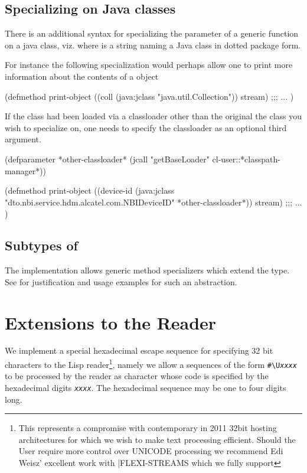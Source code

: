 \documentclass[10pt]{book}
\begin{document}
\subsection{Specializing on Java classes}

There is an additional syntax for specializing the parameter of a
generic function on a java class, viz.  where  is a string naming a Java
class in dotted package form.

For instance the following specialization would perhaps allow one to
print more information about the contents of a 
object

\begin{listing-lisp}
(defmethod print-object ((coll (java:jclass "java.util.Collection"))
                         stream)
  ;;; ...
)
\end{listing-lisp}

If the class had been loaded via a classloader other than the original
the class you wish to specialize on, one needs to specify the
classloader as an optional third argument.

\begin{listing-lisp}

(defparameter *other-classloader*
  (jcall "getBaseLoader" cl-user::*classpath-manager*))
  
(defmethod print-object
   ((device-id (java:jclass "dto.nbi.service.hdm.alcatel.com.NBIDeviceID" 
                            *other-classloader*))
    stream)
  ;;; ...
)
\end{listing-lisp}

\subsection{Subtypes of }

The implementation allows generic method specializers which extend the
 type.  See \cite{custom-specializers} for
justification and usage examples for such an abstraction.  

\section{Extensions to the Reader}

We implement a special hexadecimal escape sequence for specifying 32
bit characters to the Lisp reader\footnote{This represents a
  compromise with contemporary in 2011 32bit hosting architectures for
  which we wish to make text processing efficient.  Should the User
  require more control over \textsc{UNICODE} processing we recommend Edi Weisz'
  excellent work with \textsc|{FLEXI-STREAMS}  which we fully support}, namely we
allow a sequences of the form \verb~#\U~\emph{\texttt{xxxx}} to be processed
by the reader as character whose code is specified by the hexadecimal
digits \emph{\texttt{xxxx}}.  The hexadecimal sequence may be one to four digits
long.
\end{document}
